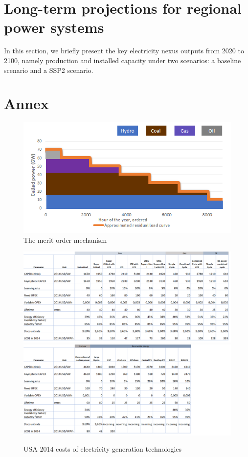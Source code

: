 \section{Long-term projections for regional power systems}
In this section, we briefly present the key electricity nexus outputs from 2020 to 2100, namely production and installed capacity under two scenarios: a baseline scenario and a SSP2 scenario.

\newpage
\section{Annex}

\begin{figure}[H]
    \centering
    \includegraphics{figures&tables/dispatch.png}
    \caption{The merit order mechanism}
    \label{fig:dispatch}
\end{figure}



\begin{landscape}
\begin{figure}
\includegraphics[scale=0.5]{figures&tables/costUSA1.png}
\includegraphics[scale=0.5]{figures&tables/costUSA2.png}
\caption{USA 2014 costs of electricity generation technologies}
\label{costs}
\end{figure}
\end{landscape}